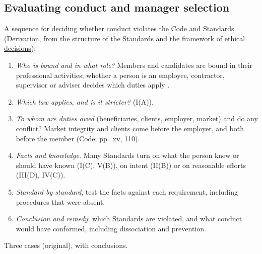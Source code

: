 \subsection{Evaluating conduct and manager selection}

\begin{qfmethod}\label{meth:evaluating-conduct-cases}
 A sequence for deciding whether conduct violates the Code and Standards (Derivation, from the structure of the Standards and the framework of \hyperref[meth:ethical-decision-framework]{ethical decisions}):
\begin{enumerate}
\item \emph{Who is bound and in what role?} Members and candidates are bound in their professional activities; whether a person is an employee, contractor, supervisor or adviser decides which duties apply \citep[pp.~36, 110--111, 120]{standards-practice-handbook-2024}.
\item \emph{Which law applies, and is it stricter?} (I(A)).
\item \emph{To whom are duties owed} (beneficiaries, clients, employer, market) and do any conflict? Market integrity and clients come before the employer, and both before the member (Code; pp.~xv, 110).
\item \emph{Facts and knowledge.} Many Standards turn on what the person knew or should have known (I(C), V(B)), on intent (II(B)) or on reasonable efforts (III(D), IV(C)).
\item \emph{Standard by standard}, test the facts against each requirement, including procedures that were absent.
\item \emph{Conclusion and remedy}: which Standards are violated, and what conduct would have conformed, including dissociation and prevention.
\end{enumerate}

 Three cases (original), with conclusions.


\end{qfmethod}
